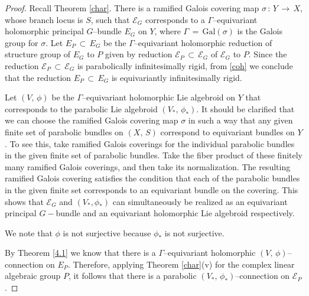 \documentclass[10pt,a4paper]{amsart}
\begin{document}
\begin{proof}
Recall Theorem \ref{char}. There is a ramified Galois covering map $\sigma\,:\, Y\,\longrightarrow\, X$,
whose branch locus is $S$, such that $\mathcal{E}_{G}$ corresponds to a
$\Gamma$--equivariant holomorphic principal $G$--bundle $E_G$ on $Y$, where $\Gamma\,=\, \text{Gal}(\sigma)$
is the Galois group for $\sigma$. Let $E_{P}\,\subset\, E_{G}$ be the $\Gamma$--equivariant holomorphic
reduction of structure group of $E_{G}$ to $P$ given by reduction $\mathcal{E}_{P}\, \subset\, \mathcal{E}_{G}$ of
$\mathcal{E}_{G}$ to $P$. Since the reduction $\mathcal{E}_{P}\, \subset\, \mathcal{E}_{G}$
is parabolically infinitesimally rigid, from \eqref{coh} we conclude that the reduction
$E_{P}\,\subset\, E_{G}$ is equivariantly infinitesimally rigid.

Let $(V,\,\phi)$ be the $\Gamma$--equivariant holomorphic Lie algebroid on $Y$ that corresponds to
the parabolic Lie algebroid $(V_{*},\, \phi_{*})$. It should be clarified that we can choose the
ramified Galois covering map $\sigma$ in such a way that any given finite set of parabolic bundles on
$(X,\,S)$ correspond to equivariant bundles on $Y$. To see this, take ramified Galois coverings for
the individual parabolic  bundles in the given finite set of parabolic
bundles. Take the fiber product of
these finitely many ramified Galois coverings, and then take its normalization. The resulting
ramified Galois covering satisfies the condition that each of the parabolic  bundles in the
given finite set corresponds to an equivariant  bundle on the covering. This shows that $\mathcal{E}_{G}$ and $(V_{*},\phi_{*})$ can simultaneously be realized as an equivariant principal $G-$bundle and an equivariant holomorphic Lie algebroid respectively.

We note that $\phi$ is not surjective because $\phi_{*}$ is not surjective.

By Theorem \ref{4.1} we know that there is a $\Gamma$--equivariant holomorphic $(V,\,\phi)$--connection on 
$E_{P}$. Therefore, applying Theorem \ref{char}(v) for the complex linear algebraic group $P$, it follows 
that there is a parabolic $(V_{*},\, \phi_{*})$--connection on $\mathcal{E}_{P}$.
\end{proof}
\end{document}
